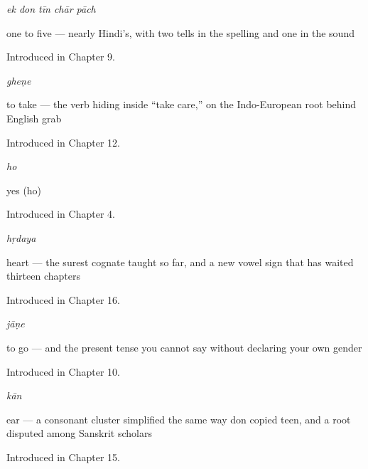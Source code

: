 \noindent\begin{minipage}[t]{\linewidth}
\raggedright
\textbf{    }\enspace\emph{ek don tīn chār pāch}\par
\small one to five — nearly Hindi's, with two tells in the spelling and one in the sound\par
\footnotesize Introduced in Chapter 9.
\end{minipage}\par\medskip

\noindent\begin{minipage}[t]{\linewidth}
\raggedright
\textbf{}\enspace\emph{gheṇe}\par
\small to take — the verb hiding inside \textquotedblleft{}take care,\textquotedblright{} on the Indo-European root behind English grab\par
\footnotesize Introduced in Chapter 12.
\end{minipage}\par\medskip

\noindent\begin{minipage}[t]{\linewidth}
\raggedright
\textbf{}\enspace\emph{ho}\par
\small yes (ho)\par
\footnotesize Introduced in Chapter 4.
\end{minipage}\par\medskip

\noindent\begin{minipage}[t]{\linewidth}
\raggedright
\textbf{}\enspace\emph{hṛdaya}\par
\small heart — the surest cognate taught so far, and a new vowel sign that has waited thirteen chapters\par
\footnotesize Introduced in Chapter 16.
\end{minipage}\par\medskip

\noindent\begin{minipage}[t]{\linewidth}
\raggedright
\textbf{}\enspace\emph{jāṇe}\par
\small to go — and the present tense you cannot say without declaring your own gender\par
\footnotesize Introduced in Chapter 10.
\end{minipage}\par\medskip

\noindent\begin{minipage}[t]{\linewidth}
\raggedright
\textbf{}\enspace\emph{kān}\par
\small ear — a consonant cluster simplified the same way don copied teen, and a root disputed among Sanskrit scholars\par
\footnotesize Introduced in Chapter 15.
\end{minipage}\par\medskip


